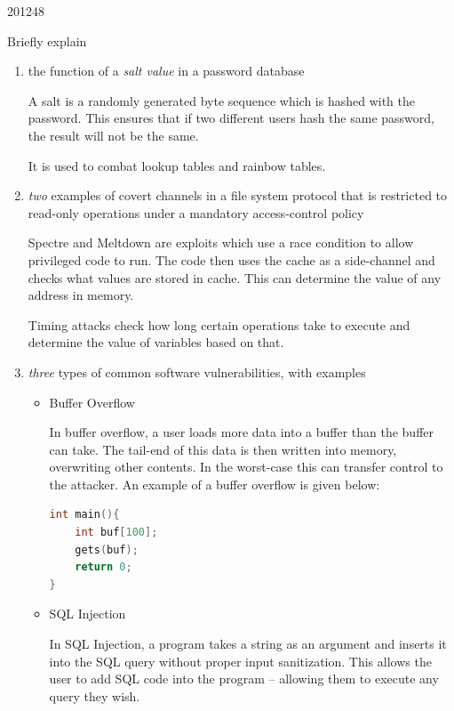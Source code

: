 \documentclass[10pt,\jkfside,a4paper]{article}
\begin{document}
\begin{examquestion}{2012}{4}{8}

Briefly explain

\begin{enumerate}

\item the function of a \textit{salt value} in a password database

A salt is a randomly generated byte sequence which is hashed with the
password. This ensures that if two different users hash the same password,
the result will not be the same.

It is used to combat lookup tables and rainbow tables.

\item \textit{two} examples of covert channels in a file system protocol
that is restricted to read-only operations under a mandatory access-control
policy

Spectre and Meltdown are exploits which use a race condition to allow
privileged code to run. The code then uses the cache as a side-channel
and checks what values are stored in cache. This can determine the
value of any address in memory.

Timing attacks check how long certain operations take to execute and
determine the value of variables based on that.

\item \textit{three} types of common software vulnerabilities, with examples

\begin{itemize}

\item Buffer Overflow

In buffer overflow, a user loads more data into a buffer than the buffer can
take. The tail-end of this data is then written into memory, overwriting
other contents. In the worst-case this can transfer control to the attacker.
An example of a buffer overflow is given below:
\begin{lstlisting}[language=C]
int main(){
	int buf[100];
	gets(buf);
	return 0;
}
\end{lstlisting}

\item SQL Injection

In SQL Injection, a program takes a string as an argument and inserts it
into the SQL query without proper input sanitization. This allows the user
to add SQL code into the program -- allowing them to execute any query they
wish.


\end{itemize}
\end{enumerate}
\end{examquestion}
\end{document}
